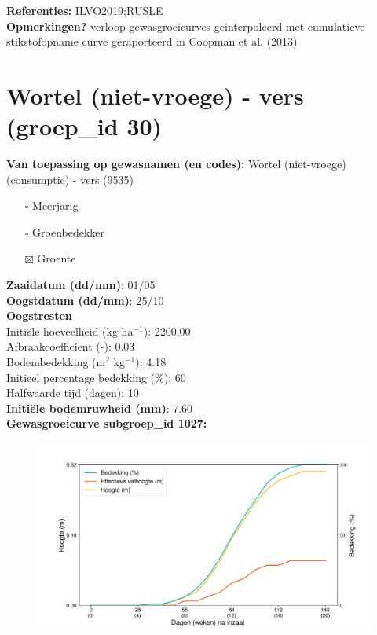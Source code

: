 \documentclass{article}
\begin{document}
  \textbf{Referenties:} ILVO2019;RUSLE \vspace{0.10cm} \\ 
  \textbf{Opmerkingen?} verloop gewasgroeicurves geinterpoleerd met cumulatieve stikstofopname curve geraporteerd in Coopman et al. (2013) \vspace{0.10cm} \\ 
 \newpage 
 \section{Wortel (niet-vroege) - vers (groep\_id 30)} 
 \textbf{Van toepassing op gewasnamen (en codes):} Wortel (niet-vroege) (consumptie) - vers (9535) 
 \begin{multicols}{3} \begin{itemize} \item[$\square$] Meerjarig \item[$\square$] Groenbedekker \item[$\boxtimes$] Groente \end{itemize} \end{multicols} 
  \textbf{Zaaidatum (dd/mm)}: 01/05  \vspace{0.10cm} \\ 
  \textbf{Oogstdatum (dd/mm)}: 25/10  \vspace{0.10cm} \\ 
  \textbf{Oogstresten} \vspace{0.05cm} \\ 
  \tab Initi\"{e}le hoeveelheid (kg ha$^{-1}$): 2200.00 \vspace{0.05cm} \\ 
  \tab Afbraakcoefficient (-): 0.03 \vspace{0.05cm} \\ 
  \tab Bodembedekking (m$^2$ kg$^{-1}$): 4.18 \vspace{0.05cm} \\ 
  \tab Initieel percentage bedekking (\%): 60 \vspace{0.05cm} \\ 
  \tab Halfwaarde tijd (dagen): 10 \vspace{0.05cm} \\ 
  \textbf{Initi\"{e}le bodemruwheid (mm)}: 7.60 \vspace{0.05cm} \\ 
  \textbf{Gewasgroeicurve subgroep\_id 1027:} 
 \begin{center} \begin{figure}[H] \includegraphics[width=12.5cm]{temp/1027.png} \end{figure} \end{center} 
\end{document}
